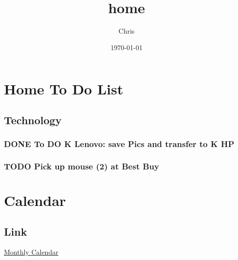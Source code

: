 \documentclass[11pt]{article}
\author{Chris}
\date{\today}
\title{home}
\begin{document}
\maketitle
\tableofcontents

\section{Home To Do List}
\label{sec-1}
\subsection{Technology}
\label{sec-1-1}
\subsubsection{{\bfseries\sffamily DONE} To DO K Lenovo: save Pics and transfer to K HP}
\label{sec-1-1-1}
\subsubsection{{\bfseries\sffamily TODO} Pick up mouse (2) at Best Buy}
\label{sec-1-1-2}
\section{Calendar}
\label{sec-2}
\subsection{Link}
\label{sec-2-1}
\href{file:///home/chris/calendar.tex}{Monthly Calendar}
\end{document}
